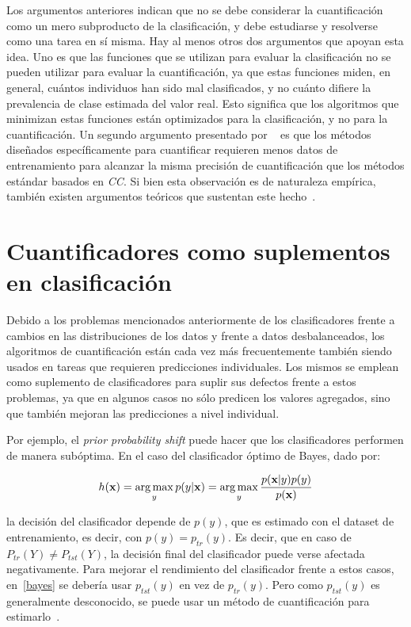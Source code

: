 Los argumentos anteriores indican que no se debe considerar la cuantificación
como un mero subproducto de la clasificación, y debe estudiarse y resolverse
como una tarea en sí misma. Hay al menos otros dos argumentos que apoyan esta
idea. Uno es que las funciones que se utilizan para evaluar la clasificación no
se pueden utilizar para evaluar la cuantificación, ya que estas funciones miden,
en general, cuántos individuos han sido mal clasificados, y no cuánto difiere la
prevalencia de clase estimada del valor real. Esto significa que los algoritmos
que minimizan estas funciones están optimizados para la clasificación, y no para
la cuantificación. Un segundo argumento presentado por
~\citet{forman2008quantifying} es que los métodos diseñados específicamente para
cuantificar requieren menos datos de entrenamiento para alcanzar la misma
precisión de cuantificación que los métodos estándar basados en {\it CC}. Si
bien esta observación es de naturaleza empírica, también existen argumentos
teóricos que sustentan este hecho~\cite{vapnik1999overview}.

\section{Cuantificadores como suplementos en clasificación}

Debido a los problemas mencionados anteriormente de los clasificadores frente a
cambios en las distribuciones de los datos y frente a datos desbalanceados, los
algoritmos de cuantificación están cada vez más frecuentemente también siendo
usados en tareas que requieren predicciones individuales. Los mismos se emplean
como suplemento de clasificadores para suplir sus defectos frente a estos
problemas, ya que en algunos casos no sólo predicen los valores agregados, sino
que también mejoran las predicciones a nivel individual.

Por ejemplo, el {\it prior probability shift\/} puede hacer que los
clasificadores performen de manera subóptima. En el caso del clasificador óptimo
de Bayes, dado por:

\begin{equation}
    h(\textbf{x}) = \operatorname*{arg\,max}_{y} p(y|\textbf{x}) = \operatorname*{arg\,max}_{y} \frac{p(\textbf{x}|y)p(y)}{p(\textbf{x})}
\end{equation}\label{bayes}

la decisión del clasificador depende de $p(y)$, que es estimado con el dataset
de entrenamiento, es decir, con $p(y) = p_{tr}(y)$. Es decir, que en caso de
$P_{tr}(Y) \neq P_{tst}(Y)$, la decisión final del clasificador puede verse
afectada negativamente. Para mejorar el rendimiento del clasificador frente a
estos casos, en~\ref{bayes} se debería usar $p_{tst}(y)$ en vez de $p_{tr}(y)$.
Pero como $p_{tst}(y)$ es generalmente desconocido, se puede usar un método de
cuantificación para estimarlo~\cite{saerens2002adjusting, alaiz2011class,
zhang2010transfer, xue2009quantification}.

